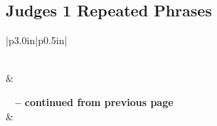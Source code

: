 \subsection{Judges 1 Repeated Phrases}


\normalsize
 
\begin{center}
\begin{longtable}{|p{3.0in}|p{0.5in}|}
\caption[Judges 1 Repeated Phrases]{Judges 1 Repeated Phrases}\label{table:Repeated Phrases Judges 1} \\
\hline {} &  \\ \hline 
\endfirsthead
 
{{\bfseries \tablename\ \thetable{} -- continued from previous page}} \\  
\hline {} &  \\ \hline 
\endhead
 

\end{longtable}
\end{center}
